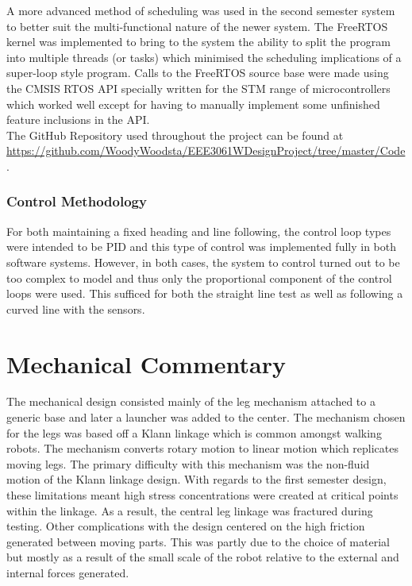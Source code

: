       A more advanced method of scheduling was used in the second semester system to better suit the multi-functional nature of the newer system. The FreeRTOS\textsuperscript{\cite{freeRTOS}} kernel was implemented to bring to the system the ability to split the program into multiple threads (or tasks) which minimised the scheduling implications of a super-loop style program. Calls to the FreeRTOS source base were made using the CMSIS RTOS API specially written for the STM range of microcontrollers which worked well except for having to manually implement some unfinished feature inclusions in the API.\\

      The GitHub Repository used throughout the project can be found at \url{https://github.com/WoodyWoodsta/EEE3061WDesignProject/tree/master/Code}.

    \subsubsection{Control Methodology}
    \label{subs:Control Methodology}
      For both maintaining a fixed heading and line following, the control loop types were intended to be PID and this type of control was implemented fully in both software systems. However, in both cases, the system to control turned out to be too complex to model and thus only the proportional component of the control loops were used. This sufficed for both the straight line test as well as following a curved line with the sensors.



\clearpage
\section{Mechanical Commentary}
\label{sec:Mechanical Commentary}
The mechanical design consisted mainly of the leg mechanism attached to a generic base and later a launcher was added to the center. The mechanism chosen for the legs was based off a Klann linkage\textsuperscript{\cite{klannLinkage}} which is common amongst walking robots. The mechanism converts rotary motion to linear motion which replicates moving legs. The primary difficulty with this mechanism was the non-fluid motion of the Klann linkage design. With regards to the first semester design, these limitations meant high stress concentrations were created at critical points within the linkage. As a result, the central leg linkage was fractured during testing. Other complications with the design centered on the high friction generated between moving parts. This was partly due to the choice of material but mostly as a result of the small scale of the robot relative to the external and internal forces generated.\\

